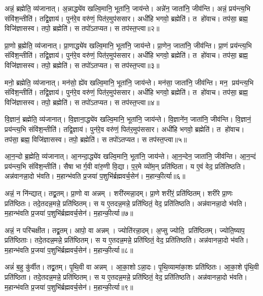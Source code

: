 अन्नं॒ ब्रह्मेति॒ व्य॑जानात्। अ॒न्नाद्ध्ये॑व खल्वि॒मानि॒ भूता॑नि॒ जाय॑न्ते। अन्ने॑न॒ जाता॑नि॒ जीव॑न्ति। अन्नं॒ प्रय॑न्त्य॒भि  संवि॑श॒न्तीति॑। तद्वि॒ज्ञाय॑। पुन॑रे॒व वरु॑णं॒ पित॑र॒मुप॑ससार। अधी॑हि भगवो॒ ब्रह्मेति॑। त हो॑वाच। तप॑सा॒ ब्रह्म॒ विजि॑ज्ञासस्व। तपो॒ ब्रह्मेति॑। स तपो॑ऽतप्यत। स तप॑स्त॒प्त्वा॥२॥

प्रा॒णो ब्र॒ह्मेति॒ व्य॑जानात्। प्रा॒णाद्ध्ये॑व खल्वि॒मानि॒ भूता॑नि॒ जाय॑न्ते। प्रा॒णेन॒ जाता॑नि॒ जीव॑न्ति। प्रा॒णं प्रय॑न्त्य॒भि  संवि॑श॒न्तीति॑। तद्वि॒ज्ञाय॑। पुन॑रे॒व वरु॑णं॒ पित॑र॒मुप॑ससार। अधी॑हि भगवो॒ ब्रह्मेति॑। त हो॑वाच। तप॑सा॒ ब्रह्म॒ विजि॑ज्ञासस्व। तपो॒ ब्रह्मेति॑। स तपो॑ऽतप्यत। स तप॑स्त॒प्त्वा॥३॥

मनो॒ ब्रह्मेति॒ व्य॑जानात्। मन॑सो॒ ह्ये॑व खल्वि॒मानि॒ भूता॑नि॒ जाय॑न्ते। मन॑सा॒ जाता॑नि॒ जीव॑न्ति। मन॒ प्रय॑न्त्य॒भि  संवि॑श॒न्तीति॑। तद्वि॒ज्ञाय॑। पुन॑रे॒व वरु॑णं॒ पित॑र॒मुप॑ससार। अधी॑हि भगवो॒ ब्रह्मेति॑। त हो॑वाच। तप॑सा॒ ब्रह्म॒ विजि॑ज्ञासस्व। तपो॒ ब्रह्मेति॑। स तपो॑ऽतप्यत। स तप॑स्त॒प्त्वा॥४॥

वि॒ज्ञानं॒ ब्रह्मेति॒ व्य॑जानात्। वि॒ज्ञाना॒द्ध्ये॑व खल्वि॒मानि॒ भूता॑नि॒ जाय॑न्ते। वि॒ज्ञाने॑न॒ जाता॑नि॒ जीव॑न्ति। वि॒ज्ञानं॒ प्रय॑न्त्य॒भि संवि॑श॒न्तीति॑। तद्वि॒ज्ञाय॑। पुन॑रे॒व वरु॑णं॒ पित॑र॒मुप॑ससार। अधी॑हि भगवो॒ ब्रह्मेति॑। त हो॑वाच। तप॑सा॒ ब्रह्म॒ विजि॑ज्ञासस्व। तपो॒ ब्रह्मेति॑। स तपो॑ऽतप्यत। स तप॑स्त॒प्त्वा॥५॥

आ॒न॒न्दो ब्र॒ह्मेति॒ व्य॑जानात्। आ॒नन्दा॒द्ध्ये॑व खल्वि॒मानि॒ भूता॑नि॒ जाय॑न्ते। आ॒न॒न्देन॒ जाता॑नि॒ जीव॑न्ति। आ॒न॒न्दं प्रय॑न्त्य॒भि संवि॑श॒न्तीति॑। सैषा भार्ग॒वी वा॑रु॒णी वि॒द्या। प॒र॒मे व्यो॑म॒न् प्रति॑ष्ठिता। य ए॒वं वेद॒ प्रति॑तिष्ठति। अन्न॑वानन्ना॒दो भ॑वति। म॒हान्भ॑वति प्र॒जया॑ प॒शुभि॑र्ब्रह्मवर्च॒सेन॑। म॒हान्की॒र्त्या॥६॥

अन्नं॒ न नि॑न्द्यात्। तद्व्र॒तम्। प्रा॒णो वा अन्नम्। शरी॑रमन्ना॒दम्। प्रा॒णे शरी॑रं॒ प्रति॑ष्ठितम्। शरी॑रे प्रा॒णः प्रति॑ष्ठितः। तदे॒तदन्न॒मन्ने॒ प्रति॑ष्ठितम्। स य ए॒तदन्न॒मन्ने॒ प्रति॑ष्ठितं॒ वेद॒ प्रति॑तिष्ठति। अन्न॑वानन्ना॒दो भ॑वति। म॒हान्भ॑वति प्र॒जया॑ प॒शुभि॑र्ब्रह्मवर्च॒सेन॑। म॒हान्की॒र्त्या॥७॥

अन्नं॒ न परि॑चक्षीत। तद्व्र॒तम्। आपो॒ वा अन्नम्। ज्योति॑रन्ना॒दम्। अ॒प्सु ज्योति॒ प्रति॑ष्ठितम्। ज्योति॒ष्याप॒ प्रति॑ष्ठिताः। तदे॒तदन्न॒मन्ने॒ प्रति॑ष्ठितम्। स य ए॒तदन्न॒मन्ने॒ प्रति॑ष्ठितं॒ वेद॒ प्रति॑तिष्ठति। अन्न॑वानन्ना॒दो भ॑वति। म॒हान्भ॑वति प्र॒जया॑ प॒शुभि॑र्ब्रह्मवर्च॒सेन॑। म॒हान्की॒र्त्या॥८॥

अन्नं॑ ब॒हु कु॑र्वीत। तद्व्र॒तम्। पृ॒थि॒वी वा अन्नम्। आ॒का॒शोऽन्ना॒दः। पृ॒थि॒व्यामा॑का॒शः प्रति॑ष्ठितः। आ॒का॒शे पृ॑थि॒वी प्रति॑ष्ठिता। तदे॒तदन्न॒मन्ने॒ प्रति॑ष्ठितम्। स य ए॒तदन्न॒मन्ने॒ प्रति॑ष्ठितं॒ वेद॒ प्रति॑तिष्ठति। अन्न॑वानन्ना॒दो भ॑वति। म॒हान्भ॑वति प्र॒जया॑ प॒शुभि॑र्ब्रह्मवर्च॒सेन॑। म॒हान्की॒र्त्या॥९॥

